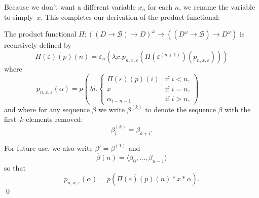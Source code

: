 \documentclass{LMCS}
\newcommand{\e}{\varepsilon}
\newcommand{\myomega}{\omega}
\newcommand{\licsmath}[1]{\[ #1 \]}
\newcommand{\pBool}{\mathcal{B}}
\newcommand{\D}{D}
\begin{document}
Because we don't want a different variable $x_n$ for each $n$, we
rename the variable to simply~$x$. This completes our derivation of
the product functional:
\pagebreak[3]
\begin{defi} \label{product:functional} The product functional
  $\Pi \colon ((\D \to \pBool) \to \D)^\myomega \to ((\D^\myomega \to
  \pBool) \to \D^\myomega)$ is recursively defined by
  \licsmath{\Pi(\e)(p)(n) = \e_n(\lambda
    x.p_{n,x,\e}(\Pi(\e^{(n+1)})(p_{n,x,\e})))}
where
\licsmath{
p_{n,x,\e}(\alpha)= p\left(\lambda i.
\begin{cases}
\Pi(\e)(p)(i) & \text{if $i < n$,}\\
x & \text{if $i = n$,} \\
\alpha_{i-n-1} & \text{if $i>n$,}
\end{cases}
\right)\qquad\qquad} and where for any sequence $\beta$ we write
$\beta^{(k)}$ to denote the sequence $\beta$ with the first~$k$
elements removed:
\[
\beta^{(k)}_i = \beta_{k+i}.
\]
\pagebreak[3]

\noindent
For future use, we also write $\beta' = \beta^{(1)}$ and
\[ \overline{\beta}(n) = \langle\beta_0, ... , \beta_{n-1}\rangle \]
so that
\[ p_{n,x,\e}(\alpha) = p(\overline{\Pi(\e)(p)}(n) * x * \alpha).\]
\qed
\end{defi}
\end{document}
